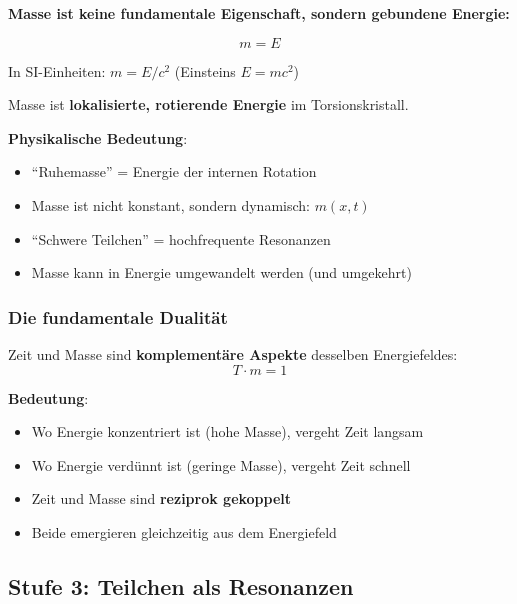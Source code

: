 	\begin{keyresult}
		\textbf{Masse ist keine fundamentale Eigenschaft, sondern gebundene Energie:}
		
		\begin{equation}
			\boxed{m = E}
		\end{equation}
		
		In SI-Einheiten: $m = E/c^2$ (Einsteins $E = mc^2$)
		
		\vspace{0.3cm}
		
		Masse ist \textbf{lokalisierte, rotierende Energie} im Torsionskristall.
	\end{keyresult}
	
	\textbf{Physikalische Bedeutung}:
	\begin{itemize}
		\item \enquote{Ruhemasse} = Energie der internen Rotation
		\item Masse ist nicht konstant, sondern dynamisch: $m(x,t)$
		\item \enquote{Schwere Teilchen} = hochfrequente Resonanzen
		\item Masse kann in Energie umgewandelt werden (und umgekehrt)
	\end{itemize}
	
	\subsubsection{Die fundamentale Dualität}
	
	Zeit und Masse sind \textbf{komplementäre Aspekte} desselben Energiefeldes:
	\begin{equation}
		\boxed{T \cdot m = 1}
	\end{equation}
	
	\textbf{Bedeutung}:
	\begin{itemize}
		\item Wo Energie konzentriert ist (hohe Masse), vergeht Zeit langsam
		\item Wo Energie verdünnt ist (geringe Masse), vergeht Zeit schnell
		\item Zeit und Masse sind \textbf{reziprok gekoppelt}
		\item Beide emergieren gleichzeitig aus dem Energiefeld
	\end{itemize}
	
	\subsection{Stufe 3: Teilchen als Resonanzen}
	
